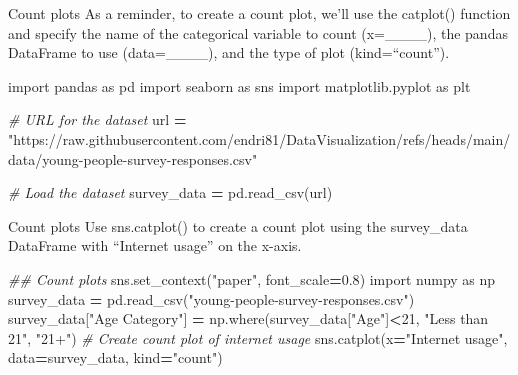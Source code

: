 \documentclass[
  ignorenonframetext,
]{beamer}
\newenvironment{Shaded}{\begin{snugshade}}{\end{snugshade}}
\newcommand{\CommentTok}[1]{\textcolor[rgb]{0.56,0.35,0.01}{\textit{#1}}}
\newcommand{\DecValTok}[1]{\textcolor[rgb]{0.00,0.00,0.81}{#1}}
\newcommand{\FloatTok}[1]{\textcolor[rgb]{0.00,0.00,0.81}{#1}}
\newcommand{\ImportTok}[1]{#1}
\newcommand{\NormalTok}[1]{#1}
\newcommand{\OperatorTok}[1]{\textcolor[rgb]{0.81,0.36,0.00}{\textbf{#1}}}
\newcommand{\StringTok}[1]{\textcolor[rgb]{0.31,0.60,0.02}{#1}}
\begin{document}
\begin{frame}[fragile]{Count plots}
\label{count-plots-2}
As a reminder, to create a count plot, we'll use the catplot() function
and specify the name of the categorical variable to count (x=\_\_\_\_),
the pandas DataFrame to use (data=\_\_\_\_), and the type of plot
(kind=``count'').


\begin{Shaded}
\begin{Highlighting}[]
\ImportTok{import}\NormalTok{ pandas }\ImportTok{as}\NormalTok{ pd}
\ImportTok{import}\NormalTok{ seaborn }\ImportTok{as}\NormalTok{ sns}
\ImportTok{import}\NormalTok{ matplotlib.pyplot }\ImportTok{as}\NormalTok{ plt}

\CommentTok{\# URL for the dataset}
\NormalTok{url }\OperatorTok{=} \StringTok{"https://raw.githubusercontent.com/endri81/DataVisualization/refs/heads/main/data/young{-}people{-}survey{-}responses.csv"}

\CommentTok{\# Load the dataset}
\NormalTok{survey\_data }\OperatorTok{=}\NormalTok{ pd.read\_csv(url)}
\end{Highlighting}
\end{Shaded}
\end{frame}

\begin{frame}[fragile]{Count plots}
\label{count-plots-3}
Use sns.catplot() to create a count plot using the survey\_data
DataFrame with ``Internet usage'' on the x-axis.


\begin{Shaded}
\begin{Highlighting}[]
\CommentTok{\#\# Count plots}
\NormalTok{sns.set\_context(}\StringTok{"paper"}\NormalTok{, font\_scale}\OperatorTok{=}\FloatTok{0.8}\NormalTok{)}
\ImportTok{import}\NormalTok{ numpy }\ImportTok{as}\NormalTok{ np}
\NormalTok{survey\_data }\OperatorTok{=}\NormalTok{ pd.read\_csv(}\StringTok{"young{-}people{-}survey{-}responses.csv"}\NormalTok{)}
\NormalTok{survey\_data[}\StringTok{"Age Category"}\NormalTok{] }\OperatorTok{=}\NormalTok{ np.where(survey\_data[}\StringTok{"Age"}\NormalTok{]}\OperatorTok{\textless{}}\DecValTok{21}\NormalTok{, }\StringTok{"Less than 21"}\NormalTok{, }\StringTok{"21+"}\NormalTok{)}
\CommentTok{\# Create count plot of internet usage}
\NormalTok{sns.catplot(x}\OperatorTok{=}\StringTok{"Internet usage"}\NormalTok{, data}\OperatorTok{=}\NormalTok{survey\_data,}
\NormalTok{            kind}\OperatorTok{=}\StringTok{"count"}\NormalTok{)}
\end{Highlighting}
\end{Shaded}
\end{frame}
\end{document}
